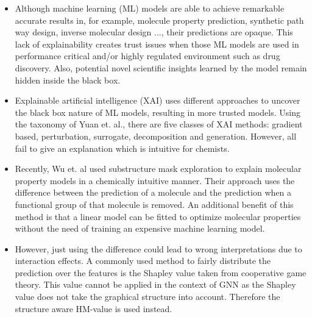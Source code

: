 \documentclass[twoside,twocolumn,9pt]{article}
\begin{document}
\begin{itemize}

    \item Although machine learning (ML) models are able to achieve remarkable accurate results in,
        for example, molecule property prediction\cite{}, synthetic path way design\cite{}, 
        inverse molecular design\cite{} ..., their predictions are opaque.\cite{} This lack 
        of explainability creates trust issues when those ML models are used in performance critical 
        and/or highly regulated environment such as drug discovery.\cite{} Also, potential novel 
        scientific insights learned by the model remain hidden inside the black box.\cite{carvalho2019machine}

	\item Explainable artificial intelligence (XAI) uses different approaches to uncover the black 
        box nature of ML models, resulting in more trusted models.\cite{carvalho2019machine} Using the taxonomy of 
        Yuan et. al., there are five classes of XAI methods: gradient based, perturbation, surrogate, 
        decomposition and generation.\cite{yuan2022explainability} However, all fail to give an explanation which is 
        intuitive for chemists.

    \item Recently, Wu et. al used substructure mask exploration to explain molecular property models 
        in a chemically intuitive manner.\cite{wu2023chemistry} Their approach uses the difference between the prediction
	      of a molecule and the prediction when a functional group of that molecule is removed.
	      An additional benefit of this method is that a linear model can be fitted to optimize
	      molecular properties without the need of training an expensive machine learning model.

	\item However, just using the difference could lead to wrong interpretations due to interaction
	      effects. A commonly used method to fairly distribute the prediction over the
          features is the Shapley value\cite{shapley1953value} taken from cooperative game theory.\cite{molnar2020interpretable} This value cannot
	      be applied in the context of GNN as the Shapley value does not take the graphical structure
	      into account. Therefore the structure aware HM-value is used instead.\cite{hamiache_value_1999, hamiache_associated_2020}
\end{itemize}
\end{document}
